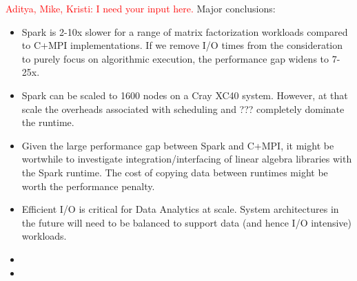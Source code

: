 \textcolor{red}{Aditya, Mike, Kristi: I need your input here.}
Major conclusions:
\begin{itemize}
\item{Spark is 2-10x slower for a range of matrix factorization workloads compared to C+MPI implementations. If we remove I/O times from the consideration to purely focus on algorithmic execution, the performance gap widens to 7-25x.}
\item{Spark can be scaled to 1600 nodes on a Cray XC40 system. However, at that scale the overheads associated with scheduling and ??? completely dominate the runtime.}
\item{Given the large performance gap between Spark and C+MPI, it might be wortwhile to investigate integration/interfacing of linear algebra libraries with the Spark runtime. The cost of copying data between runtimes might be worth the performance penalty.}
\item{Efficient I/O is critical for Data Analytics at scale. System architectures in the future will need to be balanced to support data (and hence I/O intensive) workloads.}
\item{}
\item{}
\end{itemize}